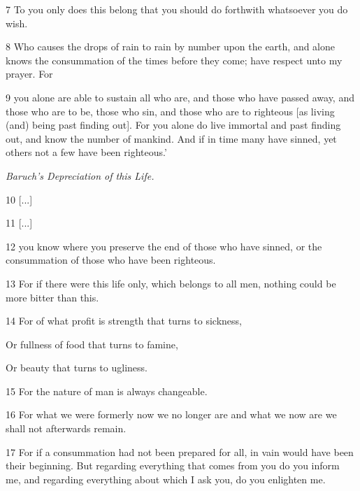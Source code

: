 \par 7 To you only does this belong that you should do forthwith whatsoever you do wish. 

\par 8 Who causes the drops of rain to rain by number upon the earth, and alone knows the consummation of the times before they come; have respect unto my prayer. For 

\par 9 you alone are able to sustain all who are, and those who have passed away, and those who are to be, those who sin, and those who are to righteous [as living (and) being past finding out]. For you alone do live immortal and past finding out, and know the number of mankind. And if in time many have sinned, yet others not a few have been righteous.’

\par \textit{Baruch's Depreciation of this Life.}

\par 10 [...]

\par 11 [...]

\par 12 you know where you preserve the end of those who have sinned, or the consummation of those who have been righteous. 

\par 13 For if there were this life only, which belongs to all men, nothing could be more bitter than this.

\par 14 For of what profit is strength that turns to sickness,

\par Or fullness of food that turns to famine,

\par Or beauty that turns to ugliness.

\par 15 For the nature of man is always changeable. 

\par 16 For what we were formerly now we no longer are and what we now are we shall not afterwards remain. 

\par 17 For if a consummation had not been prepared for all, in vain would have been their beginning. But regarding everything that comes from you do you inform me, and regarding everything about which I ask you, do you enlighten me.

